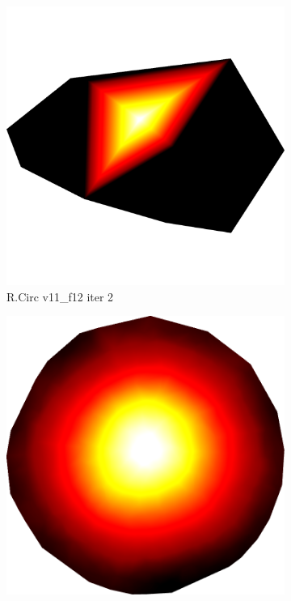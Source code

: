 \begin{figure}[ht]
{	\bigskip
	\begin{subfigure}[b]{0.48\linewidth}
		\includegraphics[width=1.0\linewidth,height=0.3\textheight,keepaspectratio,height=0.3\textheight,keepaspectratio]{data/synthetic_meshes/random_circle_tessellation_Dirac_delta_1_v11_f12_funcvals_0iter.png}
		\caption{R.Circ v11\_f12 iter 2}\label{fig:rcirc.e}
	\end{subfigure}
	\begin{subfigure}[b]{0.48\linewidth}
		\includegraphics[width=1.0\linewidth,height=0.3\textheight,keepaspectratio,height=0.3\textheight,keepaspectratio]{data/synthetic_meshes/random_circle_tessellation_Dirac_delta_10_v641_f1252_funcvals_10000iter.png}

\end{subfigure}}
\end{figure}
